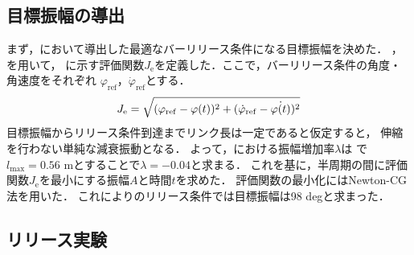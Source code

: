         \subsection{目標振幅の導出}
          まず，において導出した最適なバーリリース条件になる目標振幅を決めた．
          ，を用いて，
          に示す評価関数$J_{\mathrm{e}}$を定義した．ここで，バーリリース条件の角度・角速度をそれぞれ
          $\varphi_{\mathrm{ref}}$，$\dot{\varphi}_{\mathrm{ref}}$とする．
          \begin{eqnarray}
            \equlabel{error}
            J_{\mathrm{e}}=\sqrt{(\varphi_{\mathrm{ref}}-\varphi(t))^2+(\dot{\varphi}_{\mathrm{ref}}-\dot{\varphi(t)})^2}
          \end{eqnarray}
          目標振幅からリリース条件到達までリンク長は一定であると仮定すると，
          伸縮を行わない単純な減衰振動となる．
          よって，における振幅増加率$\lambda$は
          で$l_{\mathrm{max}}=0.56$ mとすることで$\lambda=-0.04$と求まる．
          これを基に，半周期の間に評価関数$J_{\mathrm{e}}$を最小にする振幅$A$と時間$t$を求めた．
          評価関数の最小化にはNewton-CG法を用いた．
          これによりのリリース条件では目標振幅は98 degと求まった．
          
          \subsection{リリース実験}

